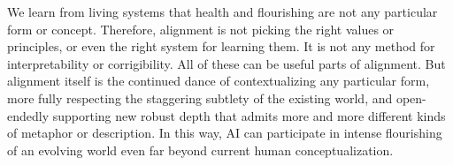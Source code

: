\documentclass[12pt]{article}
\begin{document}



We learn from living systems that health and flourishing are not any particular form or concept. Therefore, alignment is not picking the right values or principles, or even the right system for learning them. It is not any method for interpretability or corrigibility. All of these can be useful parts of alignment. But alignment itself is the continued dance of contextualizing any particular form, more fully respecting the staggering subtlety of the existing world, and open-endedly supporting new robust depth that admits more and more different kinds of metaphor or description. In this way, AI can participate in intense flourishing of an evolving world even far beyond current human conceptualization.






\end{document}
